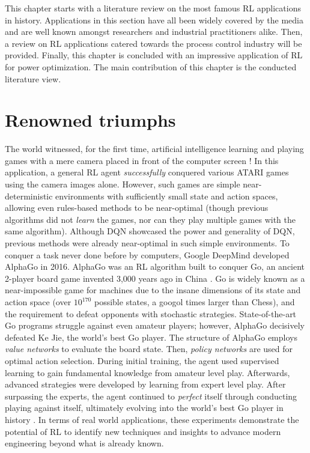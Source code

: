 %
%
% 

This chapter starts with a literature review on the most famous RL applications in history.  Applications in this section have all been widely covered by the media and are well known amongst researchers and industrial practitioners alike.  Then, a review on RL applications catered towards the process control industry will be provided. Finally, this chapter is concluded with an impressive application of RL for power optimization. The main contribution of this chapter is the conducted literature view.

\section{Renowned triumphs}
The world witnessed, for the first time, artificial intelligence learning and playing games with a mere camera placed in front of the computer screen \cite{dqn1, dqn2}!  In this application, a general RL agent \textit{successfully} conquered various ATARI games using the camera images alone. However, such games are simple near-deterministic environments with sufficiently small state and action spaces, allowing even rules-based methods to be near-optimal (though previous algorithms did not \textit{learn} the games, nor can they play multiple games with the same algorithm). Although DQN showcased the power and generality of DQN, previous methods were already near-optimal in such simple environments. To conquer a task never done before by computers, Google DeepMind developed AlphaGo in 2016.  AlphaGo was an RL algorithm built to conquer Go, an ancient 2-player board game invented 3,000 years ago in China \cite{alphago1, alphago2}. Go is widely known as a near-impossible game for machines due to the insane dimensions of its state and action space (over $10^{170}$ possible states, a googol times larger than Chess), and the requirement to defeat opponents with stochastic strategies. State-of-the-art Go programs struggle against even amateur players; however, AlphaGo decisively defeated Ke Jie, the world's best Go player. The structure of AlphaGo employs \textit{value networks} to evaluate the board state. Then, \textit{policy networks} are used for optimal action selection.  During initial training, the agent used supervised learning to gain fundamental knowledge from amateur level play.  Afterwards, advanced strategies were developed by learning from expert level play.  After surpassing the experts, the agent continued to \textit{perfect} itself through conducting playing against itself, ultimately evolving into the world's best Go player in history \cite{alphago1, alphago2}. In terms of real world applications, these experiments demonstrate the potential of RL to identify new techniques and insights to advance modern engineering beyond what is already known.

